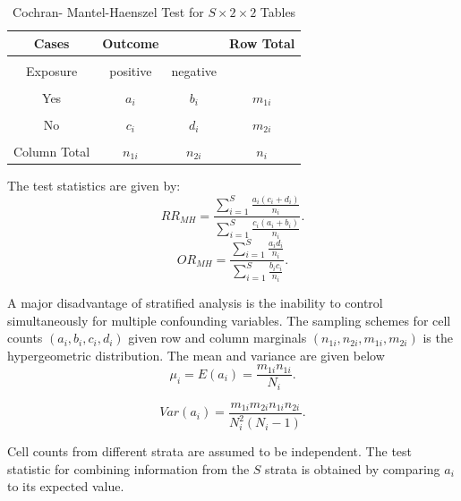 \documentclass[12pt,oneside]{report}
\theoremstyle{definition}
\theoremstyle{mystyle}
\begin{document}
\begin{table}[h!]
	\label{table:results}
	\begin{center}
		\caption{Cochran- Mantel-Haenszel Test for $S\times2\times 2$ Tables}
		\begin{tabular}{ c c c c }
			\hline
			Cases & Outcome &  &Row Total \\\hline
			&&&\\
			Exposure & positive  & negative & \\
			&&&\\
			Yes & $a_{i}$& $b_{i}$&$m_{1i}$ \\
			&&&\\
			No&  $c_{i}$ &  $d_{i}$ &$m_{2i}$\\
			&&&\\ \hline
			Column Total& $n_{1i}$&$n_{2i}$&$n_{i}$\\
			\hline
		\end{tabular}
	\end{center}
	
\end{table}		
The test statistics are given by:\\
\begin{equation}
RR_{MH}=\frac{\sum\limits_{i=1}^{S}\frac{a_{i}(c_{i}+d_{i})}{n_{i}}}{\sum\limits_{i=1}^{S}\frac{c_{i}(a_{i}+b_{i})}{n_{i}}}.
\end{equation}
\begin{equation}
OR_{MH}=\frac{\sum\limits_{i=1}^{S}\frac{a_{i}d_{i}}{n_{i}}}{\sum\limits_{i=1}^{S}\frac{b_{i}c_{i}}{n_{i}}}.
\end{equation}

\vspace{5mm}
A major disadvantage of stratified analysis is the inability to control simultaneously for multiple confounding variables. The sampling schemes for cell counts $(a_{i},b_{i},c_{i},d_{i})$ given row and column marginals $(n_{1i},n_{2i},m_{1i},m_{2i})$ is the hypergeometric distribution. The mean and variance are given below\\
\begin{equation}
\mu_{i}=E(a_{i})=\frac{m_{1i}n_{1i}}{N_{i}}.
\end{equation}

\begin{equation}
Var(a_{i})=\frac{m_{1i}m_{2i}n_{1i}n_{2i}}{N_{i}^{2}(N_{i}-1)}.
\end{equation}

\vspace{5mm}
Cell counts from different strata are assumed to be independent. The test statistic for combining information from the $S$ strata is obtained by comparing $a_{i}$ to its expected value.
\end{document}
